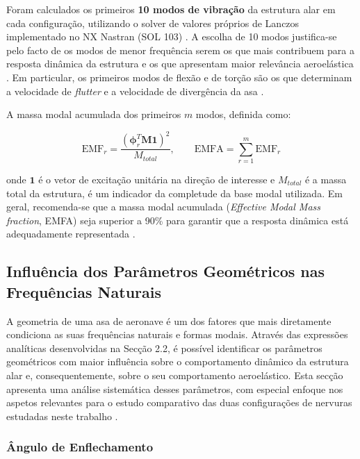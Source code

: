 \documentclass[a4paper,fleqn,noprintline]{cas-dc}
\begin{document}
Foram calculados os primeiros \textbf{10 modos de vibração} da estrutura alar em cada configuração, utilizando o solver de valores próprios de Lanczos implementado no NX Nastran (SOL 103) \cite{Nastran2014}. A escolha de 10 modos justifica-se pelo facto de os modos de menor frequência serem os que mais contribuem para a resposta dinâmica da estrutura e os que apresentam maior relevância aeroelástica \cite{Craig2006}. Em particular, os primeiros modos de flexão e de torção são os que determinam a velocidade de \textit{flutter} e a velocidade de divergência da asa \cite{Bisplinghoff1996, Fung1993}.

A massa modal acumulada dos primeiros $m$ modos, definida como:

\begin{equation}
    \text{EMF}_r = \frac{\left( \boldsymbol{\phi}_r^T \mathbf{M} 
    \mathbf{1} \right)^2}{M_{total}}, \qquad 
    \text{EMFA} = \sum_{r=1}^{m} \text{EMF}_r
    \label{eq:emf}
\end{equation}

\noindent onde $\mathbf{1}$ é o vetor de excitação unitária na direção de interesse e $M_{total}$ é a massa total da estrutura, é um indicador da completude da base modal utilizada. Em geral, recomenda-se que a massa modal acumulada (\textit{Effective Modal Mass fraction}, EMFA) seja superior a 90\% para garantir que a resposta dinâmica está adequadamente representada \cite{Craig2006, Nastran2014}.

\subsection{Influência dos Parâmetros Geométricos nas Frequências Naturais}

A geometria de uma asa de aeronave é um dos fatores que mais diretamente condiciona as suas frequências naturais e formas modais. Através das expressões analíticas desenvolvidas na Secção 2.2, é possível identificar os parâmetros geométricos com maior influência sobre o comportamento dinâmico da estrutura alar e, consequentemente, sobre o seu comportamento aeroelástico. Esta secção apresenta uma análise sistemática desses parâmetros, com especial enfoque nos aspetos relevantes para o estudo comparativo das duas configurações de nervuras estudadas neste trabalho \cite{Bisplinghoff1996, Wright2015}.

\subsubsection{Ângulo de Enflechamento}
\end{document}
